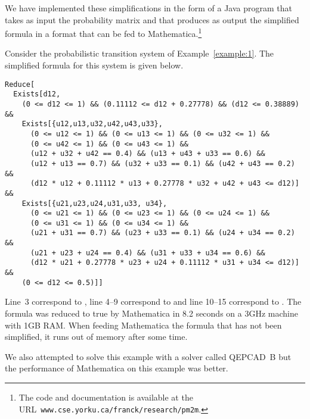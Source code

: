 \documentclass{LMCS}
\begin{document}
We have implemented these simplifications in the form of a Java program that takes
as input the probability matrix  and that produces as output the simplified
formula in a format that can be fed to Mathematica.\footnote{The code and documentation is available at the URL\ 
{\tt www.cse.yorku.ca/franck/research/pm2m}.}

\begin{exa}
Consider the probabilistic transition system of Example~\ref{example:1}.
The simplified formula for this system is given below.

\begin{small}
\begin{lstlisting}
Reduce[
  Exists[d12,
    (0 <= d12 <= 1) && (0.11112 <= d12 + 0.27778) && (d12 <= 0.38889) && 
    Exists[{u12,u13,u32,u42,u43,u33}, 
      (0 <= u12 <= 1) && (0 <= u13 <= 1) && (0 <= u32 <= 1) && 
      (0 <= u42 <= 1) && (0 <= u43 <= 1) && 
      (u12 + u32 + u42 == 0.4) && (u13 + u43 + u33 == 0.6) && 
      (u12 + u13 == 0.7) && (u32 + u33 == 0.1) && (u42 + u43 == 0.2) && 
      (d12 * u12 + 0.11112 * u13 + 0.27778 * u32 + u42 + u43 <= d12)] && 
    Exists[{u21,u23,u24,u31,u33, u34}, 
      (0 <= u21 <= 1) && (0 <= u23 <= 1) && (0 <= u24 <= 1) && 
      (0 <= u31 <= 1) && (0 <= u34 <= 1) && 
      (u21 + u31 == 0.7) && (u23 + u33 == 0.1) && (u24 + u34 == 0.2) && 
      (u21 + u23 + u24 == 0.4) && (u31 + u33 + u34 == 0.6) && 
      (d12 * u21 + 0.27778 * u23 + u24 + 0.11112 * u31 + u34 <= d12)] && 
    (0 <= d12 <= 0.5)]]
\end{lstlisting}
\end{small}
Line~3 correspond to , line 4--9 correspond to
 and line 10--15 correspond to
.  
The formula was reduced to true by Mathematica in 8.2 seconds on a 3GHz machine with 1GB RAM.
When feeding Mathematica the formula that has not been simplified, it runs out of
memory after some time.

We also attempted to solve this example with a solver called QEPCAD~B \cite{C03:jsac} but
the performance of Mathematica on this example was better.
\end{exa}
\end{document}
